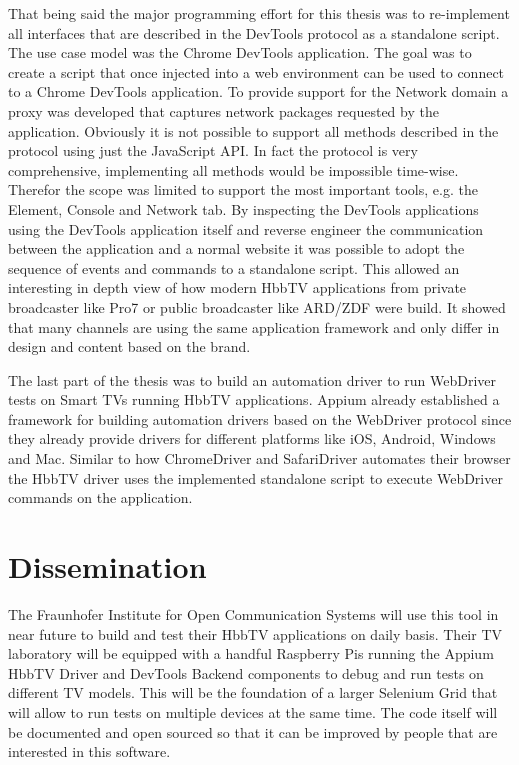 That being said the major programming effort for this thesis was to re-implement all interfaces that are described in
the DevTools protocol as a standalone script. The use case model was the Chrome DevTools application. The goal was to
create a script that once injected into a web environment can be used to connect to a Chrome DevTools application. To
provide support for the Network domain a proxy was developed that captures network packages requested by the
application. Obviously it is not possible to support all methods described in the protocol using just the JavaScript
API. In fact the protocol is very comprehensive, implementing all methods would be impossible time-wise. Therefor the
scope was limited to support the most important tools, e.g. the Element, Console and Network tab. By inspecting the
DevTools applications using the DevTools application itself and reverse engineer the communication between the
application and a normal website it was possible to adopt the sequence of events and commands to a standalone script.
This allowed an interesting in depth view of how modern HbbTV applications from private broadcaster like Pro7 or
public broadcaster like ARD/ZDF were build. It showed that many channels are using the same application framework
and only differ in design and content based on the brand.

The last part of the thesis was to build an automation driver to run WebDriver tests on Smart TVs running HbbTV
applications. Appium already established a framework for building automation drivers based on the WebDriver
protocol since they already provide drivers for different platforms like iOS, Android, Windows and Mac. Similar
to how ChromeDriver and SafariDriver automates their browser the HbbTV driver uses the implemented standalone
script to execute WebDriver commands on the application.

\section{Dissemination\label{sec:dissemination}}


The Fraunhofer Institute for Open Communication Systems will use this tool in near future to build and test their
HbbTV applications on daily basis. Their TV laboratory will be equipped with a handful Raspberry Pis running the
Appium HbbTV Driver and DevTools Backend components to debug and run tests on different TV models. This will be the
foundation of a larger Selenium Grid that will allow to run tests on multiple devices at the same time. The code
itself will be documented and open sourced so that it can be improved by people that are interested in this software.

